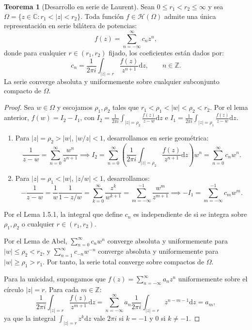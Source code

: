 \documentclass[11pt,a4paper]{article}
\theoremstyle{definition}
\newtheorem{teorema}{Teorema}[section]
\theoremstyle{remark}
\numberwithin{equation}{section}
\newcommand{\dz}{\mathrm{d}z}
\begin{document}
\begin{teorema}[Desarrollo en serie de Laurent]
Sean $0 \le r_1 < r_2 \le \infty$ y sea $\Omega = \{z \in \mathbb{C} : r_1 < |z| < r_2\}$. Toda función $f \in \mathcal{H}(\Omega)$ admite una única representación en serie bilátera de potencias:
\begin{equation}
f(z) = \sum_{n=-\infty}^\infty c_n z^n,
\end{equation}
donde para cualquier $r \in (r_1, r_2)$ fijado, los coeficientes están dados por:
\begin{equation}
c_n = \frac{1}{2\pi i} \int_{|z|=r} \frac{f(z)}{z^{n+1}} \dz, \qquad n \in \mathbb{Z}.
\end{equation}
La serie converge absoluta y uniformemente sobre cualquier subconjunto compacto de $\Omega$.
\end{teorema}
\begin{proof}
Sea $w \in \Omega$ y escojamos $\rho_1, \rho_2$ tales que $r_1 < \rho_1 < |w| < \rho_2 < r_2$. Por el lema anterior, $f(w) = I_2 - I_1$, con $I_2 = \frac{1}{2\pi i}\int_{|z|=\rho_2}\frac{f(z)}{z-w}\dz$ e $I_1 = \frac{1}{2\pi i}\int_{|z|=\rho_1}\frac{f(z)}{z-w}\dz$.
\begin{enumerate}
\item Para $|z| = \rho_2 > |w|$, $|w/z| < 1$, desarrollamos en serie geométrica:
\[
\frac{1}{z-w} = \sum_{n=0}^\infty \frac{w^n}{z^{n+1}} \implies I_2 = \sum_{n=0}^\infty \left(\frac{1}{2\pi i}\int_{|z|=\rho_2} \frac{f(z)}{z^{n+1}}\dz\right) w^n = \sum_{n=0}^\infty c_n w^n.
\]
\item Para $|z| = \rho_1 < |w|$, $|z/w| < 1$, desarrollamos:
\[
-\frac{1}{z-w} = \frac{1}{w} \frac{1}{1 - z/w} = \sum_{k=0}^\infty \frac{z^k}{w^{k+1}} = \sum_{m=-\infty}^{-1} \frac{w^m}{z^{m+1}} \implies -I_1 = \sum_{m=-\infty}^{-1} c_m w^m.
\]
\end{enumerate}
Por el Lema 1.5.1, la integral que define $c_n$ es independiente de si se integra sobre $\rho_1, \rho_2$ o cualquier $r \in (r_1, r_2)$.

Por el Lema de Abel, $\sum_{n=0}^\infty c_n w^n$ converge absoluta y uniformemente para $|w| \le \rho_2 < r_2$, y $\sum_{n=1}^\infty c_{-n} w^{-n}$ converge absoluta y uniformemente para $|w| \ge \rho_1 > r_1$. Por tanto, la serie total converge sobre compactos de $\Omega$.

Para la unicidad, supongamos que $f(z) = \sum_{n=-\infty}^\infty a_n z^n$ uniformemente sobre el círculo $|z|=r$. Para cada $m \in \mathbb{Z}$:
\[
\frac{1}{2\pi i} \int_{|z|=r} \frac{f(z)}{z^{m+1}}\dz = \sum_{n=-\infty}^\infty a_n \frac{1}{2\pi i} \int_{|z|=r} z^{n-m-1}\dz = a_m,
\]
ya que la integral $\int_{|z|=r} z^k \dz$ vale $2\pi i$ si $k = -1$ y $0$ si $k \neq -1$.
\end{proof}
\end{document}
